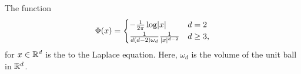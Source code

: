 \begin{Definition}
  The function
  \begin{gather}
    \label{eq:fd:fundamental}
    \Phi(x) =
    \begin{cases}
      -\tfrac{1}{2\pi} \log \lvert x\rvert & d=2\\
      \tfrac1{d(d-2)\omega_d} \frac1{\lvert x\rvert^{d-2}} & d\ge 3,
    \end{cases}
  \end{gather}
  for $x\in \mathbb R^d$ is the  to the Laplace
  equation. Here, $\omega_d$ is the volume of the unit ball in $\mathbb R^d$.
\end{Definition}



